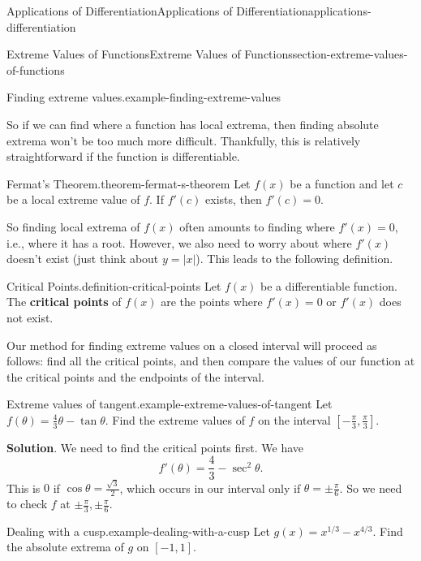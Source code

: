 \documentclass[oneside,10pt,]{book}
\newcommand{\terminology}[1]{\textbf{#1}}
\numberwithin{equation}{section}
\begin{document}
\begin{chapterptx}{Applications of Differentiation}{}{Applications of Differentiation}{}{}{applications-differentiation}
\begin{sectionptx}{Extreme Values of Functions}{}{Extreme Values of Functions}{}{}{section-extreme-values-of-functions}
\begin{example}{Finding extreme values.}{example-finding-extreme-values}
\end{example}
\hypertarget{p-319}{}%
So if we can find where a function has local extrema, then finding absolute extrema won't be too much more difficult. Thankfully, this is relatively straightforward if the function is differentiable.%
\begin{theorem}{Fermat's Theorem.}{}{theorem-fermat-s-theorem}%
\hypertarget{p-320}{}%
Let \(f(x)\) be a function and let \(c\) be a local extreme value of \(f\). If \(f'(c)\) exists, then \(f'(c) = 0\).%
\end{theorem}
\hypertarget{p-321}{}%
So finding local extrema of \(f(x)\) often amounts to finding where \(f'(x) = 0\), i.e., where it has a root. However, we also need to worry about where \(f'(x)\) doesn't exist (just think about \(y = |x|\)). This leads to the following definition.%
\begin{definition}{Critical Points.}{definition-critical-points}%
\hypertarget{p-322}{}%
Let \(f(x)\) be a differentiable function. The \terminology{critical points} of \(f(x)\) are the points where \(f'(x) = 0\) or \(f'(x)\) does not exist.%
\end{definition}
\hypertarget{p-323}{}%
Our method for finding extreme values on a closed interval will proceed as follows: find all the critical points, and then compare the values of our function at the critical points and the endpoints of the interval.%
\begin{example}{Extreme values of tangent.}{example-extreme-values-of-tangent}%
\hypertarget{p-324}{}%
Let \(f(\theta) = \frac{4}{3}\theta - \tan\theta\). Find the extreme values of \(f\) on the interval \([-\frac{\pi}{3},\frac{\pi}{3}]\).%
\par\smallskip%
\noindent\textbf{Solution}.\hypertarget{solution-71}{}\quad%
\hypertarget{p-325}{}%
We need to find the critical points first. We have%
\begin{equation*}
f'(\theta) = \frac{4}{3} - \sec^{2}\theta.
\end{equation*}
This is \(0\) if \(\cos\theta = \frac{\sqrt{3}}{2}\), which occurs in our interval only if \(\theta = \pm\frac{\pi}{6}\). So we need to check \(f\) at \(\pm\frac{\pi}{3},\pm\frac{\pi}{6}\).%
\end{example}
\begin{example}{Dealing with a cusp.}{example-dealing-with-a-cusp}%
\hypertarget{p-326}{}%
Let \(g(x) = x^{1/3} - x^{4/3}\). Find the absolute extrema of \(g\) on \([-1,1]\).%
\par\smallskip%

\end{example}
\end{sectionptx}
\end{chapterptx}
\end{document}
